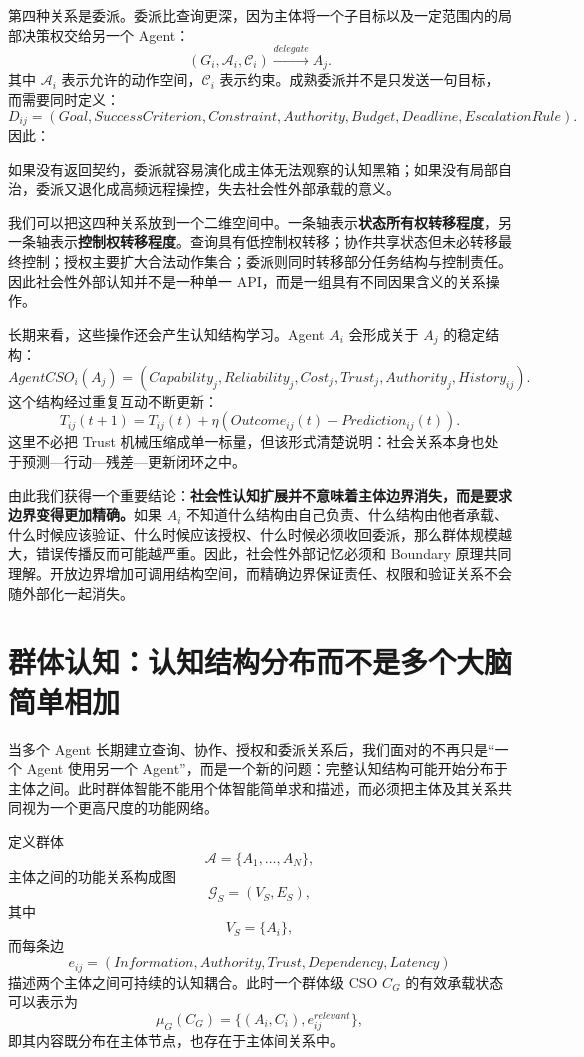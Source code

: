 第四种关系是委派。委派比查询更深，因为主体将一个子目标以及一定范围内的局部决策权交给另一个 Agent：
\[
(G_i,\mathcal A_i,\mathcal C_i)
\xrightarrow{delegate}
A_j.
\]
其中 $\mathcal A_i$ 表示允许的动作空间，$\mathcal C_i$ 表示约束。成熟委派并不是只发送一句目标，而需要同时定义：
\[
D_{ij}
=
(
Goal,
SuccessCriterion,
Constraint,
Authority,
Budget,
Deadline,
EscalationRule
).
\]
因此：
\begin{statementbox}
\centering
{}
\end{statementbox}
如果没有返回契约，委派就容易演化成主体无法观察的认知黑箱；如果没有局部自治，委派又退化成高频远程操控，失去社会性外部承载的意义。

我们可以把这四种关系放到一个二维空间中。一条轴表示\textbf{状态所有权转移程度}，另一条轴表示\textbf{控制权转移程度}。查询具有低控制权转移；协作共享状态但未必转移最终控制；授权主要扩大合法动作集合；委派则同时转移部分任务结构与控制责任。因此社会性外部认知并不是一种单一 API，而是一组具有不同因果含义的关系操作。

长期来看，这些操作还会产生认知结构学习。Agent $A_i$ 会形成关于 $A_j$ 的稳定结构：
\[
AgentCSO_i(A_j)
=
(
Capability_j,
Reliability_j,
Cost_j,
Trust_j,
Authority_j,
History_{ij}
).
\]
这个结构经过重复互动不断更新：
\[
T_{ij}(t+1)
=
T_{ij}(t)
+
\eta
\left(
Outcome_{ij}(t)-Prediction_{ij}(t)
\right).
\]
这里不必把 Trust 机械压缩成单一标量，但该形式清楚说明：社会关系本身也处于预测—行动—残差—更新闭环之中。

由此我们获得一个重要结论：\textbf{社会性认知扩展并不意味着主体边界消失，而是要求边界变得更加精确。}如果 $A_i$ 不知道什么结构由自己负责、什么结构由他者承载、什么时候应该验证、什么时候应该授权、什么时候必须收回委派，那么群体规模越大，错误传播反而可能越严重。因此，社会性外部记忆必须和 Boundary 原理共同理解。开放边界增加可调用结构空间，而精确边界保证责任、权限和验证关系不会随外部化一起消失。

\section{群体认知：认知结构分布而不是多个大脑简单相加}

当多个 Agent 长期建立查询、协作、授权和委派关系后，我们面对的不再只是``一个 Agent 使用另一个 Agent''，而是一个新的问题：完整认知结构可能开始分布于主体之间。此时群体智能不能用个体智能简单求和描述，而必须把主体及其关系共同视为一个更高尺度的功能网络。

定义群体
\[
\mathcal A
=
\{A_1,\ldots,A_N\},
\]
主体之间的功能关系构成图
\[
\mathcal G_S
=
(V_S,E_S),
\]
其中
\[
V_S=\{A_i\},
\]
而每条边
\[
e_{ij}
=
(
Information,
Authority,
Trust,
Dependency,
Latency
)
\]
描述两个主体之间可持续的认知耦合。此时一个群体级 CSO $C_G$ 的有效承载状态可以表示为
\[
\mu_G(C_G)
=
\{
(A_i,C_i),
e_{ij}^{relevant}
\},
\]
即其内容既分布在主体节点，也存在于主体间关系中。

